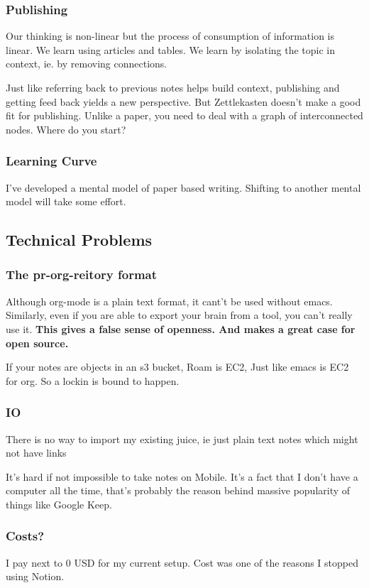 \documentclass[11pt]{article}
\begin{document}
\subsubsection{Publishing}
\label{sec:org2547ea2}
Our thinking is non-linear but the process of consumption of information is linear. We learn using articles and tables.
We learn by isolating the topic in context, ie. by removing connections.

Just like referring back to previous notes helps build context, publishing and getting feed back yields a new perspective.
But Zettlekasten doesn't make a good fit for publishing. Unlike a paper, you need to deal with a graph of interconnected nodes.
Where do you start?

\subsubsection{Learning Curve}
\label{sec:orgac0616c}
I've developed a mental model of paper based writing. Shifting to another mental model will take some effort.

\subsection{Technical Problems}
\label{sec:org55d4e71}
\subsubsection{The pr-org-reitory format}
\label{sec:org1ed59da}
Although org-mode is a plain text format, it cant't be used without emacs. Similarly, even if you are able to export your brain from a tool, you can't really use it.
\textbf{This gives a false sense of openness. And makes a great case for open source.}

If your notes are objects in an s3 bucket, Roam is EC2, Just like emacs is EC2 for org. So a lockin is bound to happen.

\subsubsection{IO}
\label{sec:org1d0d9fb}
There is no way to import my existing juice, ie just plain text notes which might not have links

It's hard if not impossible to take notes on Mobile. It's a fact that I don't have a computer all the time, that's probably the reason behind massive popularity of things like Google Keep.

\subsubsection{Costs?}
\label{sec:org0724f15}
I pay next to 0 USD for my current setup. Cost was one of the reasons I stopped using Notion.
\end{document}
